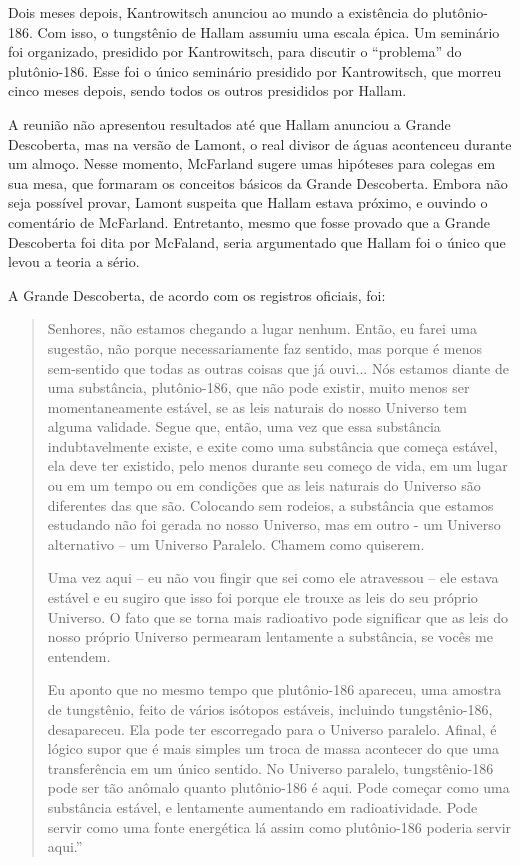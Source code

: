 \documentclass[14pt,portuguese]{extreport}
\begin{document}
	  Dois meses depois, Kantrowitsch anunciou ao mundo a existência do plutônio-186. Com isso, o tungstênio de Hallam assumiu uma escala épica. 
	  Um seminário foi organizado, presidido por Kantrowitsch, para discutir o “problema” do plutônio-186. Esse foi o único seminário presidido por Kantrowitsch, 
	  que morreu cinco meses depois,  sendo todos os outros presididos por Hallam. 
	  
	  A reunião não apresentou resultados até que Hallam anunciou a Grande Descoberta, mas na versão de Lamont, o real divisor de águas acontenceu durante um almoço. 
	  Nesse momento, McFarland sugere umas hipóteses para colegas em sua mesa, que formaram os conceitos básicos da Grande Descoberta. Embora não seja possível provar, 
	  Lamont suspeita que Hallam estava próximo, e ouvindo o comentário de McFarland. Entretanto, mesmo que fosse provado que a Grande Descoberta foi dita por McFaland, 
	  seria argumentado que Hallam foi o único que levou a teoria a sério. 
	  
	  A Grande Descoberta, de acordo com os registros oficiais, foi: 
	
	  \begin{quotation}
	    Senhores, não estamos chegando a lugar nenhum. Então, eu farei uma sugestão, não porque necessariamente faz sentido, mas porque é menos sem-sentido que todas as outras coisas que já ouvi... 
	    Nós estamos diante de uma substância, plutônio-186, que não pode existir, muito menos ser momentaneamente estável, se as leis naturais do nosso Universo tem alguma validade. 
	    Segue que, então, uma vez que essa substância indubtavelmente existe, e exite como uma substância que começa estável, ela deve ter existido, pelo menos durante seu começo de vida, 
	    em um lugar ou em um tempo ou em condições que as leis naturais do Universo são diferentes das que são. Colocando sem rodeios, a substância que estamos estudando não foi gerada no nosso Universo, 
	    mas em outro - um Universo alternativo – um Universo Paralelo. Chamem como quiserem. 
	    
	    Uma vez aqui – eu não vou fingir que sei como ele atravessou – ele estava estável e eu sugiro que isso foi porque ele trouxe as leis do seu próprio Universo. O fato que se 
	    torna mais radioativo pode significar que as leis do nosso próprio Universo permearam lentamente a substância, se vocês me entendem. 
	    
	    Eu aponto que no mesmo tempo que plutônio-186 apareceu, uma 
	    amostra de tungstênio, feito de vários isótopos estáveis, incluindo tungstênio-186, desapareceu. Ela pode ter escorregado para o Universo paralelo. Afinal, é lógico supor que é mais simples 
	    um troca de massa acontecer do que uma transferência em um único sentido. No Universo paralelo, tungstênio-186 pode ser tão anômalo quanto plutônio-186 é aqui. Pode começar como uma 
	    substância estável, e lentamente aumentando em radioatividade. Pode servir como uma fonte energética lá assim como plutônio-186 poderia servir aqui.” 
	  \end{quotation}  
	    	  
\end{document}
